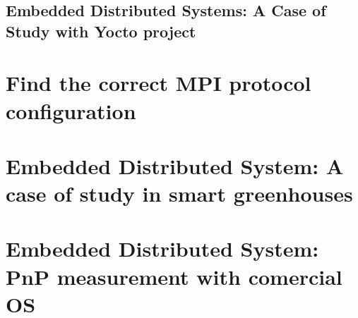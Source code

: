     \subsection {Embedded Distributed Systems: A Case of Study with Yocto project}
    \noindent

\section{Find the correct MPI protocol configuration}
\noindent

\section{Embedded Distributed System: A case of study in smart greenhouses}
\noindent

\section{Embedded Distributed System: PnP measurement with comercial OS}
\noindent

\clearpage
